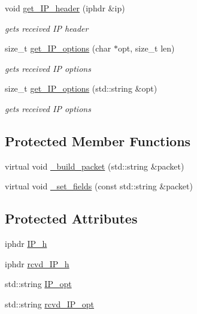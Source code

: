 \begin{CompactItemize}
void \hyperlink{classsocketpp_1_1IP__RawSocket_e477f483d5a8baa76c60399d0809d043}{get\_\-IP\_\-header} (iphdr \&ip)
\begin{CompactList}\small\item\em gets received IP header \item\end{CompactList}\item 
size\_\-t \hyperlink{classsocketpp_1_1IP__RawSocket_686fcc72997b0843b2ece0c4d8a5735d}{get\_\-IP\_\-options} (char $\ast$opt, size\_\-t len)
\begin{CompactList}\small\item\em gets received IP options \item\end{CompactList}\item 
size\_\-t \hyperlink{classsocketpp_1_1IP__RawSocket_c9bec0c1db60871bb1cb5560b97e02ed}{get\_\-IP\_\-options} (std::string \&opt)
\begin{CompactList}\small\item\em gets received IP options \item\end{CompactList}\end{CompactItemize}
\subsection*{Protected Member Functions}
\begin{CompactItemize}
\item 
virtual void \hyperlink{classsocketpp_1_1IP__RawSocket_6863cc399c543073e9aa3615c3f50940}{\_\-build\_\-packet} (std::string \&packet)
\item 
virtual void \hyperlink{classsocketpp_1_1IP__RawSocket_c39832f1ad83184cd5ba94c4c967f465}{\_\-set\_\-fields} (const std::string \&packet)
\end{CompactItemize}
\subsection*{Protected Attributes}
\begin{CompactItemize}
\item 
iphdr \hyperlink{classsocketpp_1_1IP__RawSocket_a8ddf1b2172c1e6f4b50d18c825978dc}{IP\_\-h}
\item 
iphdr \hyperlink{classsocketpp_1_1IP__RawSocket_005f2299268c452f0e1689d070fa0cab}{rcvd\_\-IP\_\-h}
\item 
std::string \hyperlink{classsocketpp_1_1IP__RawSocket_05761cfc5307ac731cb05fdc0f500469}{IP\_\-opt}
\item 
std::string \hyperlink{classsocketpp_1_1IP__RawSocket_0457fe2b23f01b7304e2bf1441fc7300}{rcvd\_\-IP\_\-opt}
\end{CompactItemize}



